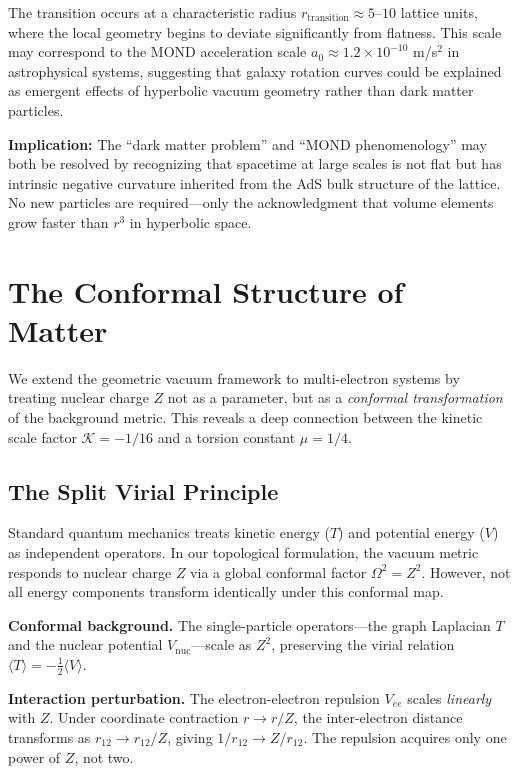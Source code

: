 \documentclass[aps,prd,twocolumn,superscriptaddress,groupedaddress,showpacs]{revtex4-2}
\begin{document}
The transition occurs at a characteristic radius $r_{\text{transition}} \approx 5$--$10$ lattice units, where the local geometry begins to deviate significantly from flatness. This scale may correspond to the MOND acceleration scale $a_0 \approx 1.2 \times 10^{-10}$ m/s$^2$ in astrophysical systems, suggesting that galaxy rotation curves could be explained as emergent effects of hyperbolic vacuum geometry rather than dark matter particles.

\textbf{Implication:} The ``dark matter problem'' and ``MOND phenomenology'' may both be resolved by recognizing that spacetime at large scales is not flat but has intrinsic negative curvature inherited from the AdS bulk structure of the lattice. No new particles are required---only the acknowledgment that volume elements grow faster than $r^3$ in hyperbolic space.

\section{The Conformal Structure of Matter}
\label{sec:conformal_matter}

We extend the geometric vacuum framework to multi-electron systems by treating nuclear charge $Z$ not as a parameter, but as a \emph{conformal transformation} of the background metric. This reveals a deep connection between the kinetic scale factor $\mathcal{K} = -1/16$ and a torsion constant $\mu = 1/4$.

\subsection{The Split Virial Principle}

Standard quantum mechanics treats kinetic energy ($T$) and potential energy ($V$) as independent operators. In our topological formulation, the vacuum metric responds to nuclear charge $Z$ via a global conformal factor $\Omega^2 = Z^2$. However, not all energy components transform identically under this conformal map.

\textbf{Conformal background.} The single-particle operators---the graph Laplacian $T$ and the nuclear potential $V_{\text{nuc}}$---scale as $Z^2$, preserving the virial relation $\langle T \rangle = -\tfrac{1}{2}\langle V \rangle$.

\textbf{Interaction perturbation.} The electron-electron repulsion $V_{ee}$ scales \emph{linearly} with $Z$. Under coordinate contraction $r \to r/Z$, the inter-electron distance transforms as $r_{12} \to r_{12}/Z$, giving $1/r_{12} \to Z/r_{12}$. The repulsion acquires only one power of $Z$, not two.
\end{document}
